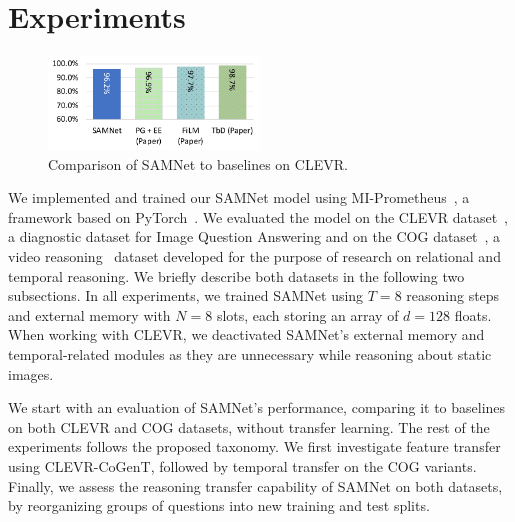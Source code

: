 \section{Experiments}
\label{sec:experiments}

\begin{figure}[b!]
	\centering
	\includegraphics[width=0.5\textwidth]{../img/plots/clevr_baselines.pdf}
	\caption{Comparison of SAMNet to baselines on CLEVR.}
	\label{fig:clevr_baselines}
\end{figure}


We implemented and trained our SAMNet model using MI-Prometheus~\cite{kornuta2018accelerating}, a framework based on PyTorch~\cite{paszke2017automatic}.
We evaluated the model on
the CLEVR dataset~\cite{johnson2017clevr}, a diagnostic dataset for Image Question Answering and on the COG dataset~\cite{yang2018dataset}, a video reasoning~\cite{mogadala2019trends} dataset developed for the purpose of research on relational and temporal reasoning.
We briefly describe both datasets in the following two subsections.
In all experiments, we trained SAMNet using $T = 8$ reasoning steps and external memory with $N = 8$ slots, each storing an array of $d = 128$ floats.
When working with CLEVR, we deactivated SAMNet's external memory and temporal-related modules as they are unnecessary while reasoning about static images.

We start with an evaluation of SAMNet's performance, comparing it to baselines on both CLEVR and COG datasets, without transfer learning.
The rest of the experiments follows the proposed taxonomy.
We first investigate feature transfer using CLEVR-CoGenT, followed by temporal transfer on the COG variants. Finally, we assess the reasoning transfer capability of SAMNet on both datasets, by reorganizing groups of questions into new training and test splits.

